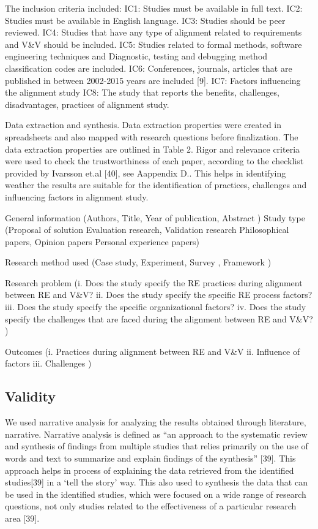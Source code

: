 \documentclass{article}
\begin{document}
The inclusion criteria included:
IC1: Studies must be available in full text.
IC2: Studies must be available in English language.
IC3: Studies should be peer reviewed.
IC4: Studies that have any type of alignment related to requirements and   V&V should be included.
IC5: Studies related to formal methods, software engineering techniques and Diagnostic, testing and debugging method classification codes are included.
IC6: Conferences, journals, articles that are published in between 2002-2015 years are included [9].
IC7: Factors influencing the alignment study
IC8: The study that reports the benefits, challenges, disadvantages, practices of alignment study.

Data extraction and synthesis. Data extraction properties were created in spreadsheets and also mapped with research questions before finalization. The data extraction properties are outlined in Table 2. Rigor and relevance criteria were used to check the trustworthiness of each paper, according to the checklist provided by Ivarsson et.al [40], see Aappendix D.. This helps in identifying weather the results are suitable for the identification of practices, challenges and influencing factors in alignment study.

General information (Authors, Title, Year of publication, Abstract )
Study type (Proposal of solution Evaluation research, Validation research Philosophical papers, Opinion papers
Personal experience papers)

Research method used (Case study,  Experiment,  Survey ,  Framework )

Research problem (i.	Does the study specify the RE practices during alignment between RE and V&V?
ii.	Does the study specify the specific RE process factors?
iii.	Does the study specify the specific organizational factors?
iv.	Does the study specify the challenges that are faced during the alignment between RE and V&V?
)

Outcomes (i.	Practices during alignment between RE and V&V
ii.	Influence of factors
iii.	Challenges
)

\subsection{Validity}

We used narrative analysis for analyzing the results obtained through literature, narrative. Narrative analysis is defined as “an approach to the systematic review and synthesis of findings from multiple studies that relies primarily on the use of words and text to summarize and explain findings of the synthesis” [39]. This approach helps in process of explaining the data retrieved from the identified studies[39] in a ‘tell the story’ way. This also used to synthesis the data that can be used in the identified studies, which were focused on a wide range of research questions, not only studies related to the effectiveness of a particular research area [39].
\end{document}
